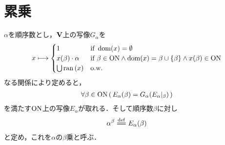 \section{累乗}
	\begin{screen}
		\begin{dfn}[順序数の累乗]
			$\alpha$を順序数とし，$\mathbf{V}$上の写像$G_\alpha$を
			\begin{align}
				x \longmapsto 
				\begin{cases}
					1 & \mbox{if } \operatorname{dom}(x) = \emptyset \\
					x(\beta) \cdot \alpha & \mbox{if } \beta \in \mathrm{ON} \wedge \operatorname{dom}(x) = \beta \cup \{\beta\} 
					\wedge x(\beta) \in \mathrm{ON} \\
					\bigcup \operatorname*{ran} \left(x\right) & \mbox{o.w.}
				\end{cases}
			\end{align}
			なる関係により定めると，
			\begin{align}
				\forall \beta \in \mathrm{ON}\, (\, E_\alpha(\beta) = G_\alpha(E_\alpha|_\beta)\, )
			\end{align}
			を満たす$\mathrm{ON}$上の写像$E_\alpha$が取れる．そして順序数$\beta$に対し
			\begin{align}
				\alpha^\beta \defeq E_\alpha(\beta)
			\end{align}
			と定め，これを$\alpha$の$\beta$乗と呼ぶ．
		\end{dfn}
	\end{screen}
	